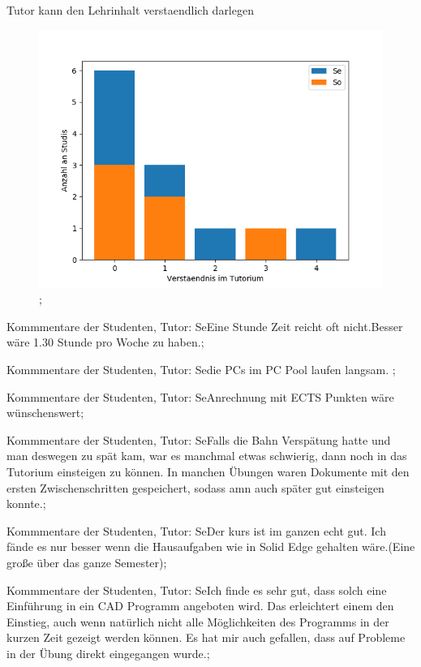 \documentclass[10pt]{beamer}
\begin{document}
\begin{frame}[fragile]{Tutor kann den Lehrinhalt verstaendlich darlegen} 
 \begin{figure}
 \includegraphics[width= 0.9\linewidth]{./PDFcreater/Plots/Nx/Tutor+kann+den+Lehrinhalt+verstaendlich+darlegen.png};
 \end{figure}
 \end{frame}
\begin{frame}[fragile]{Kommmentare der Studenten, Tutor: Se}Eine Stunde Zeit reicht oft nicht.Besser wäre 1.30 Stunde pro Woche zu haben.;
 \end{frame}
\begin{frame}[fragile]{Kommmentare der Studenten, Tutor: Se}die PCs im PC Pool laufen langsam. ;
 \end{frame}
\begin{frame}[fragile]{Kommmentare der Studenten, Tutor: Se}Anrechnung mit ECTS Punkten wäre wünschenswert;
 \end{frame}
\begin{frame}[fragile]{Kommmentare der Studenten, Tutor: Se}Falls die Bahn Verspätung hatte und man deswegen zu spät kam, war es manchmal etwas schwierig, dann noch in das Tutorium einsteigen zu können. In manchen Übungen waren Dokumente mit den ersten Zwischenschritten gespeichert, sodass amn auch später gut einsteigen konnte.;
 \end{frame}
\begin{frame}[fragile]{Kommmentare der Studenten, Tutor: Se}Der kurs ist im ganzen echt gut. Ich fände es nur 
 besser wenn die Hausaufgaben wie in Solid Edge gehalten wäre.(Eine große über das ganze Semester);
 \end{frame}
\begin{frame}[fragile]{Kommmentare der Studenten, Tutor: Se}Ich finde es sehr gut, dass solch eine Einführung in ein CAD Programm angeboten wird. Das erleichtert einem den Einstieg, auch wenn natürlich nicht alle Möglichkeiten des Programms in der kurzen Zeit gezeigt werden können. Es hat mir auch gefallen, dass auf Probleme in der Übung direkt eingegangen wurde.;
 \end{frame}
\end{document}

